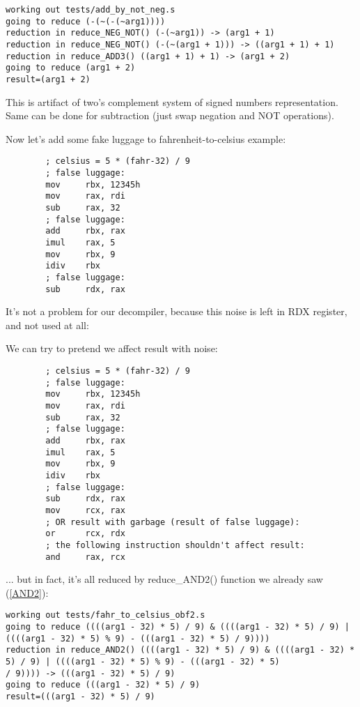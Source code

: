 ﻿\documentclass[12pt]{article}
\begin{document}
\begin{lstlisting}
working out tests/add_by_not_neg.s
going to reduce (-(~(-(~arg1))))
reduction in reduce_NEG_NOT() (-(~arg1)) -> (arg1 + 1)
reduction in reduce_NEG_NOT() (-(~(arg1 + 1))) -> ((arg1 + 1) + 1)
reduction in reduce_ADD3() ((arg1 + 1) + 1) -> (arg1 + 2)
going to reduce (arg1 + 2)
result=(arg1 + 2)
\end{lstlisting}

This is artifact of two's complement system of signed numbers representation.
Same can be done for subtraction (just swap negation and NOT operations).

Now let's add some fake luggage to fahrenheit-to-celsius example:

\begin{lstlisting}
        ; celsius = 5 * (fahr-32) / 9
        ; false luggage:
        mov     rbx, 12345h
        mov     rax, rdi
        sub     rax, 32
        ; false luggage:
        add     rbx, rax
        imul    rax, 5
        mov     rbx, 9
        idiv    rbx
        ; false luggage:
        sub     rdx, rax
\end{lstlisting}

It's not a problem for our decompiler, because this noise is left in RDX register, and not used at all:



We can try to pretend we affect result with noise:

\begin{lstlisting}
        ; celsius = 5 * (fahr-32) / 9
        ; false luggage:
        mov     rbx, 12345h
        mov     rax, rdi
        sub     rax, 32
        ; false luggage:
        add     rbx, rax
        imul    rax, 5
        mov     rbx, 9
        idiv    rbx
        ; false luggage:
        sub     rdx, rax
        mov     rcx, rax
        ; OR result with garbage (result of false luggage):
        or      rcx, rdx
        ; the following instruction shouldn't affect result:
        and     rax, rcx
\end{lstlisting}

... but in fact, it's all reduced by reduce\_AND2() function we already saw (\ref{AND2}):

\begin{lstlisting}
working out tests/fahr_to_celsius_obf2.s
going to reduce ((((arg1 - 32) * 5) / 9) & ((((arg1 - 32) * 5) / 9) | ((((arg1 - 32) * 5) % 9) - (((arg1 - 32) * 5) / 9))))
reduction in reduce_AND2() ((((arg1 - 32) * 5) / 9) & ((((arg1 - 32) * 5) / 9) | ((((arg1 - 32) * 5) % 9) - (((arg1 - 32) * 5)
/ 9)))) -> (((arg1 - 32) * 5) / 9)
going to reduce (((arg1 - 32) * 5) / 9)
result=(((arg1 - 32) * 5) / 9)
\end{lstlisting}
\end{document}
